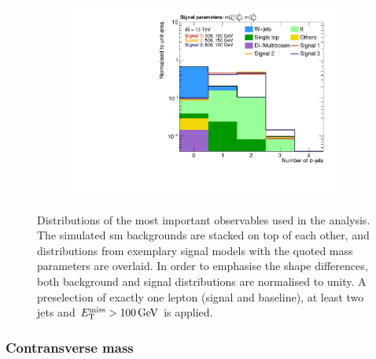 \begin{figure}
\begin{subfigure}[b]{0.49\linewidth}
		\centering\includegraphics[width=\textwidth]{presel/nBJet}
		\caption{\label{fig:norm_nbjet}}
	\end{subfigure}
	\caption{Distributions of the most important observables used in the analysis. The simulated \gls{sm} backgrounds are stacked on top of each other, and distributions from exemplary signal models with the quoted mass parameters are overlaid. In order to emphasise the shape differences, both background and signal distributions are normalised to unity. A preselection of exactly one lepton (signal and baseline), at least two jets and $\etmiss > \SI{100}{\GeV}$ is applied.}\label{fig:norm_obs}
\end{figure}

\subsubsection{Contransverse mass}

